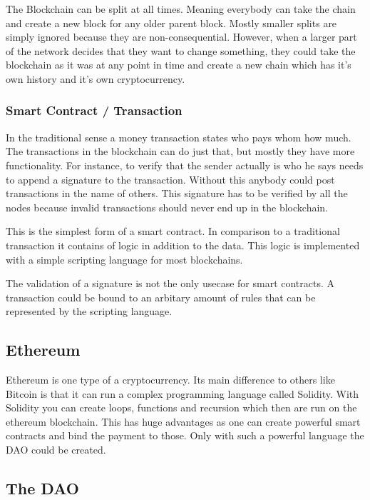 \documentclass[a4paper, 11pt]{scrartcl}
\begin{document}
The Blockchain can be split at all times. Meaning everybody can take the chain and create a new block for any older parent block. Mostly smaller splits are simply ignored because they are non-consequential. However, when a larger part of the network decides that they want to change something, they could take the blockchain as it was at any point in time and create a new chain which has it's own history and it's own cryptocurrency. \cite{blockchainKai}

\subsubsection{Smart Contract / Transaction}

In the traditional sense a money transaction states who pays whom how much. The transactions in the blockchain can do just that, but mostly they have more functionality. For instance, to verify that the sender actually is who he says needs to append a signature to the transaction. Without this anybody could post transactions in the name of others. This signature has to be verified by all the nodes because invalid transactions should never end up in the blockchain. \cite{blockchainKai}

This is the simplest form of a smart contract. In comparison to a traditional transaction it contains of logic in addition to the data. This logic is implemented with a simple scripting language for most blockchains. \cite{blockchainKai} 

The validation of a signature is not the only usecase for smart contracts. A transaction could be bound to an arbitary amount of rules that can be represented by the scripting language. \cite{blockchainKai}

\subsection{Ethereum}

Ethereum is one type of a cryptocurrency. Its main difference to others like Bitcoin is that it can run a complex programming language called Solidity. With Solidity you can create loops, functions and recursion which then are run on the ethereum blockchain. This has huge advantages as one can create powerful smart contracts and bind the payment to those. Only with such a powerful language the DAO could be created. \cite{eth}

\subsection{The DAO}
\end{document}
